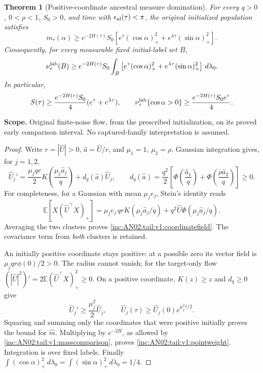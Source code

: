 \documentclass[11pt]{article}
\numberwithin{equation}{section}
\newtheorem{theorem}{Theorem}[section]
\theoremstyle{remark}\newtheorem{remark}[theorem]{Remark}
\newcommand{\E}{\mathbb E}
\newcommand{\dd}{\,d}
\newcommand{\1}{\mathbf 1}
\newcommand{\scope}[1]{\par\noindent\textbf{Scope.} #1\par\smallskip}
\begin{document}
\begin{theorem}[Positive-coordinate ancestral measure domination]
\label{inc:AN02:tail:v1:weightedmass}
For every $q>0$, $0<\rho<1$, $S_0>0$, and time with
$\epsilon_{\rm al}(\tau)<\pi$, the original initialized population satisfies
\begin{equation}\label{inc:AN02:tail:v1:pointweight}
 m_\tau(\alpha)\ge e^{-2H(\tau)}S_0
 \left[e^\tau(\cos\alpha)_+^2+e^{\lambda\tau}(\sin\alpha)_+^2\right].
\end{equation}
Consequently, for every measurable fixed initial-label set $B$,
\begin{equation}\label{inc:AN02:tail:v1:measureweight}
 \nu_\tau^{\rm lab}(B)\ge e^{-2H(\tau)}S_0
 \int_B\left[e^\tau(\cos\alpha)_+^2+
 e^{\lambda\tau}(\sin\alpha)_+^2\right]\dd\lambda_0.
\end{equation}
In particular,
\begin{equation}\label{inc:AN02:tail:v1:totalweight}
 S(\tau)\ge\frac{e^{-2H(\tau)}S_0}{4}(e^\tau+e^{\lambda\tau}),
 \qquad
 \nu_\tau^{\rm lab}\{\cos\alpha>0\}\ge
 \frac{e^{-2H(\tau)}S_0e^\tau}{4}.
\end{equation}
\end{theorem}
\scope{Original finite-noise flow, from the prescribed initialization, on
its proved early comparison interval. No captured-family interpretation is assumed.}
\begin{proof}
Write $r=|\widehat U|>0$, $\widehat a=\widehat U/r$, and
$\mu_1=1$, $\mu_2=\rho$. Gaussian integration gives, for $j=1,2$,
\begin{equation}\label{inc:AN02:tail:v1:coordinatefield}
 \widehat U_j'=\frac{\mu_jqr}{2}
 K\left(\frac{\mu_j\widehat a_j}{q}\right)
 +d_q(\widehat a)\widehat U_j,\qquad
 d_q(\widehat a)=\frac{q^2}{2}
 \left[\Phi\left(\frac{\widehat a_1}{q}\right)
 +\Phi\left(\frac{\rho\widehat a_2}{q}\right)\right]\ge0.
\end{equation}
For completeness, for a Gaussian with mean $\mu_j e_j$, Stein's identity
reads
\[
 \E[X(\widehat U^\top X)_+]
 =\mu_j e_j\,qrK(\mu_j\widehat a_j/q)
 +q^2\widehat U\Phi(\mu_j\widehat a_j/q).
\]
Averaging the two clusters proves \eqref{inc:AN02:tail:v1:coordinatefield}.
The covariance term from \emph{both} clusters is retained.

An initially positive coordinate stays positive: at a possible zero its
vector field is $\mu_jqr\phi(0)/2>0$. The radius cannot vanish; for the
target-only flow $(|\widehat U|^2)'=2\E(\widehat U^\top X)_+^2\ge0$.
On a positive coordinate, $K(z)\ge z$ and $d_q\ge0$ give
\[
 \widehat U_j'\ge\frac{\mu_j^2}{2}\widehat U_j,
 \qquad
 \widehat U_j(\tau)\ge\widehat U_j(0)e^{\mu_j^2\tau/2}.
\]
Squaring and summing only the coordinates that were positive initially
proves the bound for $\widehat m$. Multiplying by $e^{-2H}$, as allowed
by \eqref{inc:AN02:tail:v1:masscomparison}, proves
\eqref{inc:AN02:tail:v1:pointweight}. Integration is over fixed labels.
Finally $\int(\cos\alpha)_+^2\dd\lambda_0=
\int(\sin\alpha)_+^2\dd\lambda_0=1/4$.
\end{proof}
\end{document}
